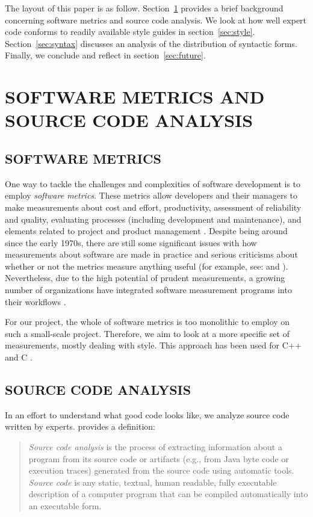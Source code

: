\documentclass[12pt,abstracton]{scrartcl}
\begin{document}
The layout of this paper is as follow.
Section~\ref{sec:metric} provides a brief background
concerning software metrics and source code analysis.
We look at how well expert code conforms to readily available
style guides in section~\ref{sec:style}.
Section~\ref{sec:syntax} discusses an analysis
of the distribution of syntactic forms.
Finally, we conclude and reflect in section~\ref{sec:future}.
\section{SOFTWARE METRICS AND SOURCE CODE ANALYSIS}\label{sec:metric}
\subsection{SOFTWARE METRICS}
One way to tackle the challenges and complexities of software development is to employ
\emph{software metrics}. These metrics allow developers and their managers to make
measurements about cost and effort, productivity, assessment of reliability and
quality, evaluating processes (including development and maintenance), and elements
related to project and product management \cite{Ord08}. Despite being around since
the early 1970s, there are still some significant issues with how measurements
about software are made in practice and serious criticisms about whether or not the metrics
measure anything useful (for example, see: \cite{Jon94} and \cite{Bou12}).
Nevertheless, due to the high potential of prudent measurements,
a growing number of organizations have integrated software measurement programs into
their workflows \cite{Ord08}.

For our project, the whole of software metrics is too monolithic to employ on
such a small-scale project. Therefore, we aim to look at a more specific set of measurements,
mostly dealing with style. This approach has been used for C++ \cite{Aye98} and C \cite{Tak11}.
\subsection{SOURCE CODE ANALYSIS}
In an effort to understand what good code looks like, we analyze source code
written by experts. \cite{Bin07} provides a definition:
\begin{quote}
\emph{Source code analysis} is the process of extracting
information about a program from its source code
or artifacts (e.g., from Java byte code or execution
traces) generated from the source code using automatic tools.
\emph{Source code} is any static, textual,
human readable, fully executable description of
a computer program that can be compiled automatically into an executable form.
\end{quote}
\end{document}
